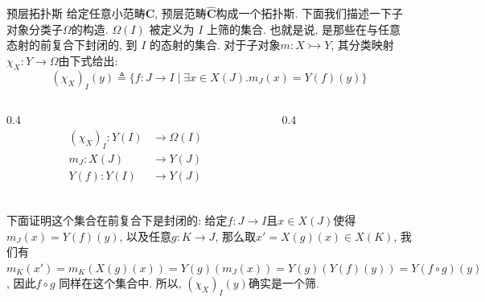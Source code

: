 \documentclass[aspectratio=169,xcolor=dvipsnames]{beamer}
\newcommand\bfC{\mathbf{C}}
\begin{document}
\begin{frame}{预层拓扑斯}
给定任意小范畴$\bfC$, 预层范畴$\widehat{\bfC}$构成一个拓扑斯. 下面我们描述一下子对象分类子$\Omega$的构造. $\Omega(I)$ 被定义为 $I$ 上筛的集合. 也就是说, 是那些在与任意态射的前复合下封闭的, 到 $I$ 的态射的集合. 对于子对象$m:X\rightarrowtail Y$, 其分类映射 $\chi_{X}:Y\to\Omega$由下式给出:
\[
(\chi_{X})_{I}(y)\triangleq\{f:J\to I\mid \exists x\in X(J).m_{J}(x)=Y(f)(y)\}
\]


\begin{columns}[c]
  \begin{column}{0.4\textwidth}
\begin{align*}
  (\chi_{X})_{I} : Y(I) &\to \Omega(I) \\
  m_{J} :X(J) &\to Y(J) \\
  Y(f) : Y(I) &\to Y(J) \\
\end{align*}
\end{column}
\begin{column}{0.4\textwidth}
\end{column}
\end{columns}


下面证明这个集合在前复合下是封闭的: 给定$f:J\to I$且$x\in X(J)$使得$m_{J}(x)=Y(f)(y)$, 以及任意$g: K\to J$, 那么取$x'=X(g)(x)\in X(K)$, 我们有$m_{K}(x')=m_{K}(X(g)(x))=Y(g)(m_{J}(x))=Y(g)(Y(f)(y))=Y(f\circ g)(y)$, 因此$f\circ g$ 同样在这个集合中. 所以, $(\chi_{X})_{I}(y)$确实是一个筛.
\end{frame}
\end{document}
